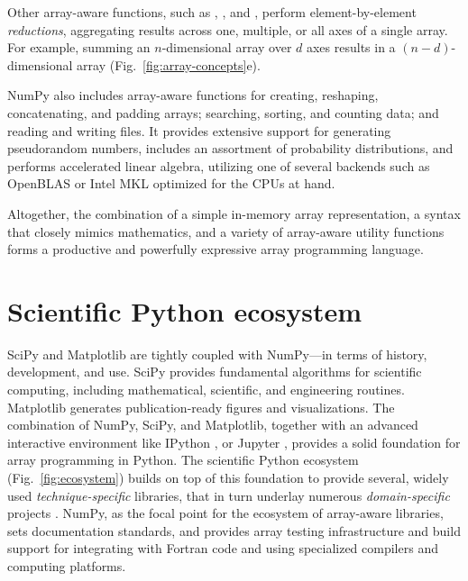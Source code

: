 Other array-aware functions, such as , , and , perform
element-by-element \emph{reductions}, aggregating results across one,
multiple, or all axes of a single array.
For example, summing an $n$-dimensional array over $d$ axes results in a
$(n-d)$-dimensional array (Fig.~\ref{fig:array-concepts}e).

NumPy also includes array-aware functions for creating, reshaping, concatenating, and padding
arrays; searching, sorting, and counting data; and reading and writing files.
It provides extensive support for generating pseudorandom numbers,
includes an assortment of probability distributions, and
performs accelerated linear algebra, utilizing one of several backends
such as OpenBLAS \cite{wang2013augem,xianyi2012model} or Intel MKL optimized
for the CPUs at hand.

Altogether, the combination of a simple in-memory array
representation, a syntax that closely mimics mathematics, and a
variety of array-aware utility functions forms a productive and
powerfully expressive array programming language.

\section*{Scientific Python ecosystem}

SciPy and Matplotlib are tightly coupled with NumPy---in terms of
history, development, and use.
SciPy provides fundamental algorithms for scientific computing,
including mathematical, scientific, and engineering routines.
Matplotlib generates publication-ready figures and visualizations.
The combination of NumPy, SciPy, and Matplotlib, together with
an advanced interactive environment like IPython \cite{perez2007ipython},
or Jupyter \cite{Kluyver:2016aa}, provides a solid foundation for array
programming in Python.
The scientific Python ecosystem (Fig.~\ref{fig:ecosystem}) builds on top of
this foundation to provide several, widely used \emph{technique-specific}
libraries\cite{pedregosa2011scikit,vanderwalt2014scikit,SciPyProceedings_11},
that in turn underlay numerous \emph{domain-specific} projects
\cite{astropy:2013,astropy:2018,cock2009biopython,millman2007analysis,sunpy2015,2018EGUGA..2012146H}.
NumPy, as the focal point for the ecosystem of array-aware libraries,
sets documentation standards, and provides array testing infrastructure
and build support for integrating with Fortran code and using specialized
compilers and computing platforms.

